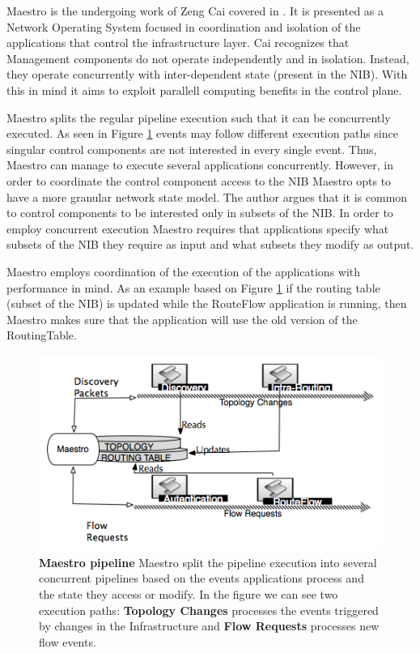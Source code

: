 \begin{itemize}
Maestro is the undergoing work of Zeng Cai covered in
\cite{maestro}. It is presented as a Network Operating System focused
in coordination and isolation of the applications  that control the
infrastructure layer. Cai recognizes that Management components do not
operate independently and in isolation. Instead, they operate
concurrently with inter-dependent state (present in the NIB). With this in mind
it aims to exploit parallell computing benefits in the control plane. 

Maestro splits the regular pipeline execution such that it can
be concurrently executed. As seen in Figure \ref{fig:maestro-pipeline} events may
follow different execution paths since singular control components are
not interested in every single event. Thus, Maestro can manage to
execute several applications concurrently. However, in order to
coordinate the control component access to the NIB Maestro opts to
have a more granular network state model. The author argues that it is
common to control components to be  interested only in  subsets of the
NIB. In order to employ concurrent execution Maestro requires that
applications specify  what subsets of the NIB they require as input
and what subsets they modify as output. 

Maestro employs
coordination of the  execution of the applications with performance in
mind. As an example based on Figure \ref{fig:maestro-pipeline} if the routing table
(subset of the NIB) is updated while the RouteFlow application is running, then
Maestro makes sure that the application will use the old version of
the RoutingTable.

\begin{figure}
  \centering 
  \footnotesize
  \includegraphics[scale=0.5]{pic/maestro-pipeline.png}
  \caption[Maestro pipeline]{\textbf{Maestro pipeline} Maestro split the pipeline execution
  into several concurrent pipelines based on the events applications
  process and the state they access or modify. In the figure we can
  see two execution paths: \textbf{Topology Changes} processes the
  events triggered by changes in the Infrastructure and \textbf{Flow
    Requests} processes new flow events.}
  \label{fig:maestro-pipeline}
\end{figure}



\end{itemize}
